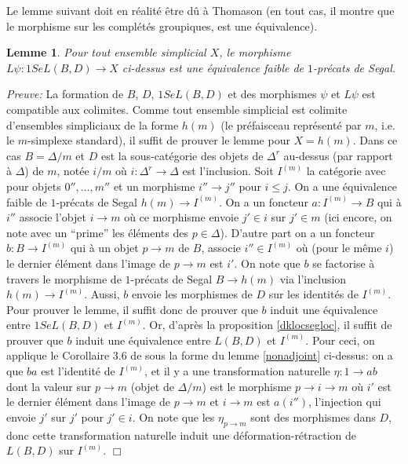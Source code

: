 \documentclass[12pt]{article}
\newcommand{\eop}{\hfill $\Box$\vspace{.1in}}
\newtheorem{lemme}[lemma]{Lemme}
\begin{document}
Le lemme suivant doit en r\'ealit\'e \^etre d\^u \`a Thomason
\cite{ThomasonLimits}
(en tout cas,
il montre que le morphisme sur les compl\'et\'es groupiques, est une
\'equivalence).

\begin{lemme}
\label{bd}
Pour tout ensemble simplicial $X$, le morphisme
$L\psi : 1SeL(B,D)\rightarrow X$ ci-dessus est une \'equivalence faible de
$1$-pr\'ecats de Segal.
\end{lemme}
{\em Preuve:}
La formation de $B$, $D$, $1SeL(B,D)$ et des morphismes $\psi$ et $L\psi$
est compatible aux colimites. Comme tout ensemble simplicial est colimite
d'ensembles simpliciaux de la forme $h(m)$ (le pr\'efaisceau repr\'esent\'e par
$m$, i.e. le $m$-simplexe standard), il suffit de prouver le lemme pour
$X=h(m)$. Dans ce cas $B=\Delta /m$ et $D$ est la sous-cat\'egorie des objets de
$\Delta ^r$ au-dessus (par rapport \`a $\Delta$) de $m$, not\'ee $i/m$ o\`u $i:
\Delta ^r\rightarrow \Delta $ est l'inclusion. Soit $I^{(m)}$ la cat\'egorie
avec pour objets $0'',\ldots , m''$ et un morphisme $i''\rightarrow j''$ pour
$i\leq j$. On a une \'equivalence faible de $1$-pr\'ecats de Segal
$h(m)\rightarrow I^{(m)}$.
On a un foncteur $a: I^{(m)}\rightarrow B$ qui \`a $i''$ associe l'objet
$i\rightarrow m$ o\`u ce morphisme envoie $j'\in i$ sur $j'\in m$
(ici encore, on note avec un ``prime'' les \'el\'ements des $p\in \Delta$).
D'autre part on a un foncteur $b: B\rightarrow I^{(m)}$ qui \`a un objet
$p\rightarrow m$ de $B$, associe $i''\in I^{(m)}$  o\`u (pour le m\^eme
$i$) le dernier \'el\'ement dans l'image de $p\rightarrow m$ est $i'$.
On note que $b$ se factorise \`a travers le morphisme de $1$-pr\'ecats de Segal
$B\rightarrow h(m)$ via l'inclusion $h(m)\rightarrow I^{(m)}$. Aussi, $b$
envoie les morphismes de $D$ sur les identit\'es de $I^{(m)}$. Pour prouver le
lemme, il suffit donc de prouver que $b$ induit une \'equivalence entre
$1SeL(B,D)$ et $I^{(m)}$. Or, d'apr\`es  la proposition \ref{dklocsegloc}, il
suffit de prouver que $b$ induit une \'equivalence
entre $L(B,D)$ et $I^{(m)}$. Pour ceci, on applique le Corollaire 3.6 de
\cite{DwyerKan2} sous la forme du lemme \ref{nonadjoint} ci-dessus:  on a que
$ba$ est l'identit\'e de $I^{(m)}$, et il y a une transformation
naturelle $\eta : 1\rightarrow ab$ dont la valeur sur $p\rightarrow m$
(objet de $\Delta /m$) est le morphisme $p\rightarrow i \rightarrow m$ o\`u $i'$
est le dernier \'el\'ement dans l'image de $p\rightarrow m$ et  $i\rightarrow
m$ est $a(i'')$, l'injection qui envoie $j'$ sur $j'$ pour $j'\in i$.
On note que les $\eta _{p\rightarrow m}$ sont des morphismes dans $D$, donc
cette transformation naturelle induit une d\'eformation-r\'etraction de
$L(B,D)$ sur
$I^{(m)}$.
\eop
\end{document}
